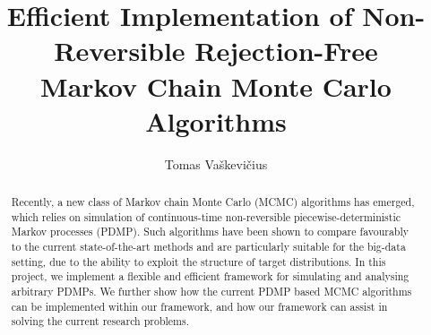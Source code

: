 \documentclass[12pt]{ociamthesis}
\title{\vspace{-0.4cm}Efficient Implementation of Non-Reversible Rejection-Free \\
       Markov Chain Monte Carlo Algorithms}
\author{Tomas Vaškevičius}
\begin{document}
\maketitle

\begin{abstract}
Recently, a new class of Markov chain Monte Carlo (MCMC) algorithms has emerged, which
relies on simulation of continuous-time non-reversible piecewise-deterministic Markov processes (PDMP).
Such algorithms have been shown to compare favourably to the current state-of-the-art methods
and are particularly suitable for the big-data setting, due to the ability to exploit
the structure of target distributions.
In this project, we implement a flexible and efficient framework for
simulating and analysing arbitrary PDMPs.
We further show how the current PDMP based MCMC algorithms can be implemented within
our framework, and how our framework can assist in solving the current
research problems.

\end{abstract}

\setcounter{tocdepth}{1}
\begin{romanpages}
\tableofcontents
\end{romanpages}



\appendix

\cleardoublepage
{}
\renewcommand{\bibname}{References}

\end{document}
